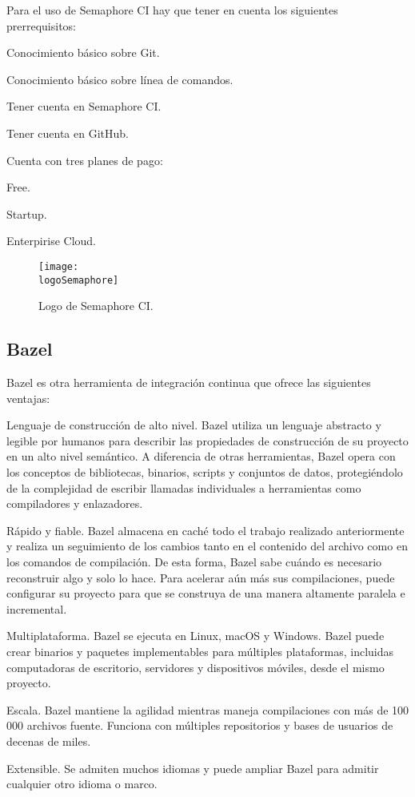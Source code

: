 Para el uso de Semaphore CI hay que tener en cuenta los siguientes prerrequisitos:
\begin{compactitem}
    \item Conocimiento básico sobre Git.
    \item Conocimiento básico sobre línea de comandos.
    \item Tener cuenta en Semaphore CI.
    \item Tener cuenta en GitHub.
\end{compactitem}

Cuenta con tres planes de pago:
\begin{compactitem}
    \item Free.
    \item Startup.
    \item Enterpirise Cloud.
\end{compactitem}

\begin{figure}[h]
    \centering
    \texttt{[image: \\logoSemaphore]}
    \caption{Logo de Semaphore CI.}
\end{figure}

\subsection{Bazel}
Bazel es otra herramienta de integración continua que ofrece las siguientes ventajas:
\begin{compactitem}
    \item Lenguaje de construcción de alto nivel. Bazel utiliza un lenguaje abstracto y legible por humanos para describir las propiedades de construcción de su proyecto en un alto nivel semántico. A diferencia de otras herramientas, Bazel opera con los conceptos de bibliotecas, binarios, scripts y conjuntos de datos, protegiéndolo de la complejidad de escribir llamadas individuales a herramientas como compiladores y enlazadores.
    \item Rápido y fiable. Bazel almacena en caché todo el trabajo realizado anteriormente y realiza un seguimiento de los cambios tanto en el contenido del archivo como en los comandos de compilación. De esta forma, Bazel sabe cuándo es necesario reconstruir algo y solo lo hace. Para acelerar aún más sus compilaciones, puede configurar su proyecto para que se construya de una manera altamente paralela e incremental.
    \item Multiplataforma. Bazel se ejecuta en Linux, macOS y Windows. Bazel puede crear binarios y paquetes implementables para múltiples plataformas, incluidas computadoras de escritorio, servidores y dispositivos móviles, desde el mismo proyecto.
    \item Escala. Bazel mantiene la agilidad mientras maneja compilaciones con más de 100 000 archivos fuente. Funciona con múltiples repositorios y bases de usuarios de decenas de miles.
    \item Extensible. Se admiten muchos idiomas y puede ampliar Bazel para admitir cualquier otro idioma o marco.
\end{compactitem}

